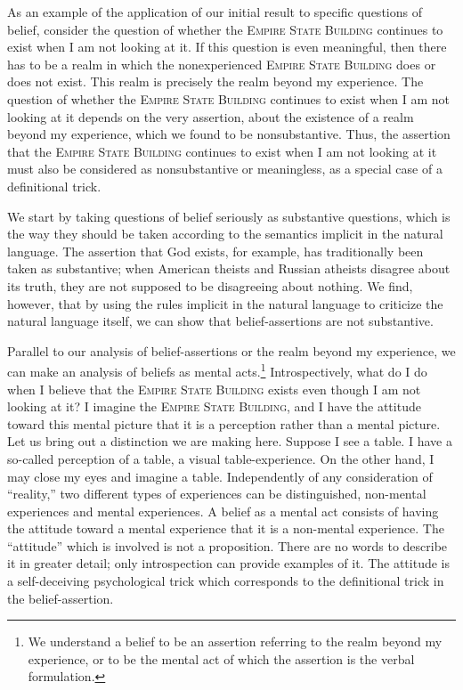 As an example of the application of our initial result to specific 
questions of belief, consider the question of whether the \textsc{Empire State 
Building} continues to exist when I am not looking at it. If this question is 
even meaningful, then there has to be a realm in which the nonexperienced 
\textsc{Empire State Building} does or does not exist. This realm is precisely the 
realm beyond my experience. The question of whether the \textsc{Empire State 
Building} continues to exist when I am not looking at it depends on the very 
assertion, about the existence of a realm beyond my experience, which we 
found to be nonsubstantive. Thus, the assertion that the \textsc{Empire State 
Building} continues to exist when I am not looking at it must also be 
considered as nonsubstantive or meaningless, as a special case of a 
definitional trick. 

We start by taking questions of belief seriously as substantive questions, 
which is the way they should be taken according to the semantics implicit in 
the natural language. The assertion that God exists, for example, has 
traditionally been taken as substantive; when American theists and Russian 
atheists disagree about its truth, they are not supposed to be disagreeing 
about nothing. We find, however, that by using the rules implicit in the 
natural language to criticize the natural language itself, we can show that 
belief-assertions are not substantive. 

Parallel to our analysis of belief-assertions or the realm beyond my 
experience, we can make an analysis of beliefs as mental acts.\footnote{We 
understand a belief to be an assertion referring to the realm beyond my 
experience, or to be the mental act of which the assertion is the verbal 
formulation.} Introspectively, what do I do when I believe that the \textsc{Empire 
State Building} exists even though I am not looking at it? I imagine the 
\textsc{Empire State Building}, and I have the attitude toward this mental picture 
that it is a perception rather than a mental picture. Let us bring out a 
distinction we are making here. Suppose I see a table. I have a so-called 
perception of a table, a visual table-experience. On the other hand, I may 
close my eyes and imagine a table. Independently of any consideration of 
\enquote{reality,} two different types of experiences can be distinguished, 
non-mental experiences and mental experiences. A belief as a mental act 
consists of having the attitude toward a mental experience that it is a 
non-mental experience. The \enquote{attitude} which is involved is not a 
proposition. There are no words to describe it in greater detail; only 
introspection can provide examples of it. The attitude is a self-deceiving 
psychological trick which corresponds to the definitional trick in the 
belief-assertion. 

